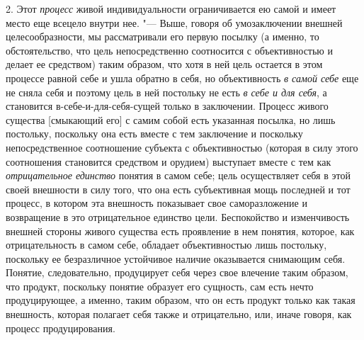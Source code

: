 {{2. Этот {\em процесс}
живой индивидуальности ограничивается ею самой и имеет место
еще всецело внутри нее. "--- Выше, говоря об умозаключении
внешней целесообразности, мы рассматривали его первую посылку (а именно, то
обстоятельство, что цель непосредственно соотносится с объективностью и
делает ее средством) таким образом, что хотя в ней цель остается в этом
процессе равной себе и ушла обратно в себя, но объективность
{\em в самой себе} еще не
сняла себя и поэтому цель в ней постольку не есть
{\em в себе и для себя},
а становится в-себе-и-для-себя-сущей только в заключении.
Процесс живого существа [смыкающий его] с самим собой есть указанная
посылка, но лишь постольку, поскольку она есть вместе с тем заключение и
поскольку непосредственное соотношение субъекта с объективностью (которая в
силу этого соотношения становится средством и орудием) выступает вместе с
тем как {\em отрицательное единство}
понятия в самом себе; цель осуществляет себя в этой своей
внешности в силу того, что она есть субъективная мощь последней и тот
процесс, в котором эта внешность показывает свое саморазложение
и возвращение в это отрицательное единство цели.
Беспокойство и изменчивость внешней стороны живого существа есть проявление
в нем понятия, которое, как отрицательность в самом себе, обладает
объективностью лишь постольку, поскольку ее безразличное устойчивое наличие
оказывается снимающим себя. Понятие, следовательно, продуцирует себя через
свое влечение таким образом, что продукт, поскольку понятие образует его
сущность, сам есть нечто продуцирующее, а именно, таким образом, что он
есть продукт только как такая внешность, которая полагает себя также и
отрицательно, или, иначе говоря, как процесс продуцирования.

}}
